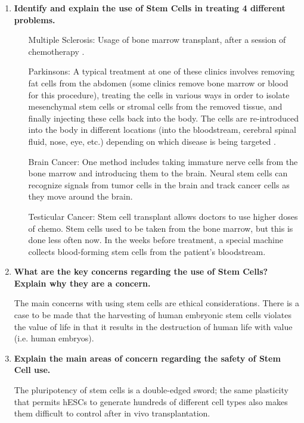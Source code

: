 \documentclass[a4paper]{article}
\begin{document}
\begin{enumerate}
    \item \textbf{Identify and explain the use of Stem Cells in treating 4 different problems.}
\begin{itemize}
\item[Multiple Sclerosis:] Usage of bone marrow transplant, after a session of chemotherapy \cite{WebMD2019}.
\item[Parkinsons:] A typical treatment at one of these clinics involves removing fat cells from the abdomen (some clinics remove bone marrow or blood for this procedure), treating the cells in various ways in order to isolate mesenchymal stem cells or stromal cells from the removed tissue, and finally injecting these cells back into the body. The cells are re-introduced into the body in different locations (into the bloodstream, cerebral spinal fluid, nose, eye, etc.) depending on which disease is being targeted \cite{REBECCAGILBERT2018}.
\item[Brain Cancer:] One method includes taking immature nerve cells from the bone marrow and introducing them to the brain. Neural stem cells can recognize signals from tumor cells in the brain and track cancer cells as they move around the brain. \cite{HealthGuideInfo2010}
\item[Testicular Cancer:] Stem cell transplant allows doctors to use higher doses of chemo. Stem cells used
to be taken from the bone marrow, but this is done less often now. In the weeks before
treatment, a special machine collects blood-forming stem cells from the patient's
bloodstream. \cite{Cancer.org2018}
\end{itemize}


    \item \textbf{What are the key concerns regarding the use of Stem Cells? Explain why they are a concern. \cite{Rickard2002}}

The main concerns with using stem cells are ethical considerations. There is a case to be made that the harvesting of human embryonic stem cells violates the value of life in that it results in the destruction of human life with value (i.e. human embryos).


    \item \textbf{Explain the main areas of concern regarding the safety of Stem Cell use. \cite{Volarevic2018}}

The pluripotency of stem cells is a double-edged sword; the same plasticity that permits hESCs to generate hundreds of different cell types also makes them difficult to control after in vivo transplantation.


\end{enumerate}
\end{document}
